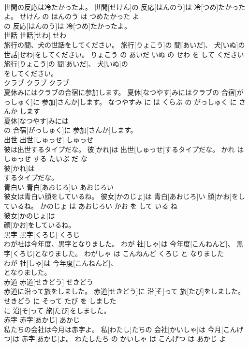 \documentclass[8pt]{extreport}
\begin{document}
\begin{CJK}{UTF8}{min}
\\	世間の反応は冷たかったよ。	世間[せけん]の 反応[はんのう]は 冷[つめ]たかったよ。	せけん の はんのう は つめたかった よ	
\\	の 反応[はんのう]は 冷[つめ]たかったよ。			
\\	世話	世話[せわ]	せわ	
\\	旅行の間、犬の世話をしてください。	旅行[りょこう]の 間[あいだ]、 犬[いぬ]の 世話[せわ]をしてください。	りょこう の あいだ いぬ の せわ を して ください	
\\	旅行[りょこう]の 間[あいだ]、 犬[いぬ]の
\\	をしてください。			
\\	クラブ	クラブ	クラブ	
\\	夏休みにはクラブの合宿に参加します。	夏休[なつやす]みにはクラブの 合宿[がっしゅく]に 参加[さんか]します。	なつやすみ に は くらぶ の がっしゅく に さんか します	
\\	夏休[なつやす]みには
\\	の 合宿[がっしゅく]に 参加[さんか]します。			
\\	出世	出世[しゅっせ]	しゅっせ	
\\	彼は出世するタイプだな。	彼[かれ]は 出世[しゅっせ]するタイプだな。	かれ は しゅっせ する たいぷ だ な	
\\	彼[かれ]は
\\	するタイプだな。			
\\	青白い	青白[あおじろ]い	あおじろい	
\\	彼女は青白い顔をしているね。	彼女[かのじょ]は 青白[あおじろ]い 顔[かお]をしているね。	かのじょ は あおじろい かお を して いる ね	
\\	彼女[かのじょ]は
\\	顔[かお]をしているね。			
\\	黒字	黒字[くろじ]	くろじ	
\\	わが社は今年度、黒字となりました。	わが 社[しゃ]は 今年度[こんねんど]、 黒字[くろじ]となりました。	わがしゃ は こんねんど くろじ と なりました	
\\	わが 社[しゃ]は 今年度[こんねんど]、
\\	となりました。			
\\	赤道	赤道[せきどう]	せきどう	
\\	赤道に沿って旅をしました。	赤道[せきどう]に 沿[そ]って 旅[たび]をしました。	せきどう に そって たび を しました	
\\	に 沿[そ]って 旅[たび]をしました。			
\\	赤字	赤字[あかじ]	あかじ	
\\	私たちの会社は今月は赤字よ。	私[わたし]たちの 会社[かいしゃ]は 今月[こんげつ]は 赤字[あかじ]よ。	わたしたち の かいしゃ は こんげつ は あかじ よ	

\end{CJK}
\end{document}
